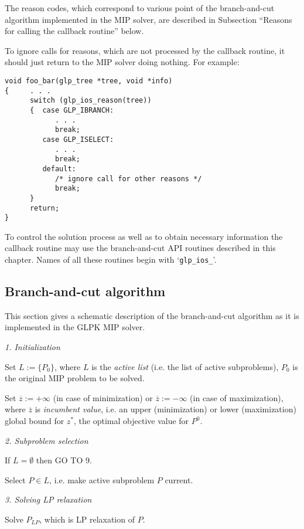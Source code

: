 The reason codes, which correspond to various point of the
branch-and-cut algorithm implemented in the MIP solver, are described
in Subsection ``Reasons for calling the callback routine'' below.

To ignore calls for reasons, which are not processed by the callback
routine, it should just return to the MIP solver doing nothing. For
example:

\begin{verbatim}
void foo_bar(glp_tree *tree, void *info)
{     . . .
      switch (glp_ios_reason(tree))
      {  case GLP_IBRANCH:
            . . .
            break;
         case GLP_ISELECT:
            . . .
            break;
         default:
            /* ignore call for other reasons */
            break;
      }
      return;
}
\end{verbatim}

To control the solution process as well as to obtain necessary
information the callback routine may use the branch-and-cut API
routines described in this chapter. Names of all these routines begin
with `\verb|glp_ios_|'.

\subsection{Branch-and-cut algorithm}

This section gives a schematic description of the branch-and-cut
algorithm as it is implemented in the GLPK MIP solver.

\medskip

{\it 1. Initialization}

Set $L:=\{P_0\}$, where $L$ is the {\it active list} (i.e. the list of
active subproblems), $P_0$ is the original MIP problem to be solved.

Set $\overline{z}:=+\infty$ (in case of minimization) or
$\overline{z}:=-\infty$ (in case of maximization), where $\overline{z}$
is {\it incumbent value}, i.e. an upper (minimization) or lower
(maximization) global bound for $z^*$, the optimal objective value for
$P^0$.

\medskip

{\it 2. Subproblem selection}

If $L=\emptyset$ then GO TO 9.

Select $P\in L$, i.e. make active subproblem $P$ current.

\medskip

{\it 3. Solving LP relaxation}

Solve $P_{LP}$, which is LP relaxation of $P$.

